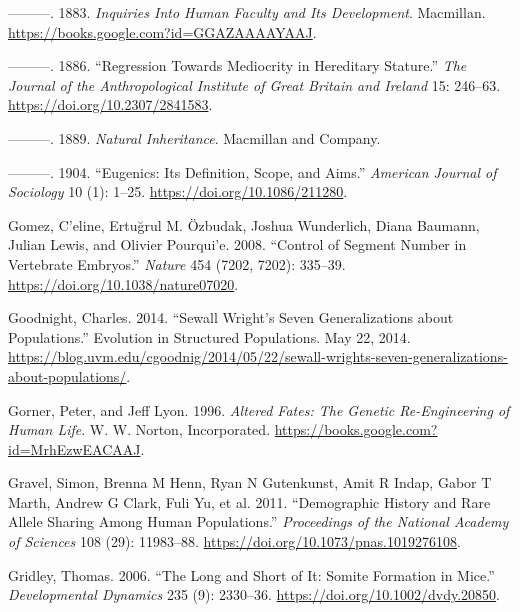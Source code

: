 \documentclass[
]{book}
\newlength{\cslhangindent}
\newlength{\cslentryspacingunit} %
\newenvironment{CSLReferences}[2] %
 {%
  \setlength{\parindent}{0pt}
  \ifodd #1
  \let\oldpar\par
  \def\par{\hangindent=\cslhangindent\oldpar}
  \fi
  \setlength{\parskip}{#2\cslentryspacingunit}
 }%
 {}
\begin{document}
\begin{CSLReferences}{1}{0}
\leavevmode{}%
---------. 1883. \emph{Inquiries {Into Human Faculty} and {Its Development}}. {Macmillan}. \url{https://books.google.com?id=GGAZAAAAYAAJ}.

\leavevmode{}%
---------. 1886. {``Regression {Towards Mediocrity} in {Hereditary Stature}.''} \emph{The Journal of the Anthropological Institute of Great Britain and Ireland} 15: 246--63. \url{https://doi.org/10.2307/2841583}.

\leavevmode{}%
---------. 1889. \emph{Natural Inheritance}. {Macmillan and Company}.

\leavevmode{}%
---------. 1904. {``Eugenics: {Its Definition}, {Scope}, and {Aims}.''} \emph{American Journal of Sociology} 10 (1): 1--25. \url{https://doi.org/10.1086/211280}.

\leavevmode{}%
Gomez, C'eline, Ertuğrul M. Özbudak, Joshua Wunderlich, Diana Baumann, Julian Lewis, and Olivier Pourqui'e. 2008. {``Control of Segment Number in Vertebrate Embryos.''} \emph{Nature} 454 (7202, 7202): 335--39. \url{https://doi.org/10.1038/nature07020}.

\leavevmode{}%
Goodnight, Charles. 2014. {``Sewall {Wright}'s {Seven Generalizations} about {Populations}.''} {Evolution in Structured Populations}. May 22, 2014. \url{https://blog.uvm.edu/cgoodnig/2014/05/22/sewall-wrights-seven-generalizations-about-populations/}.

\leavevmode{}%
Gorner, Peter, and Jeff Lyon. 1996. \emph{Altered {Fates}: {The Genetic Re-Engineering} of {Human Life}}. {W. W. Norton, Incorporated}. \url{https://books.google.com?id=MrhEzwEACAAJ}.

\leavevmode{}%
Gravel, Simon, Brenna M Henn, Ryan N Gutenkunst, Amit R Indap, Gabor T Marth, Andrew G Clark, Fuli Yu, et al. 2011. {``Demographic History and Rare Allele Sharing Among Human Populations.''} \emph{Proceedings of the National Academy of Sciences} 108 (29): 11983--88. \url{https://doi.org/10.1073/pnas.1019276108}.

\leavevmode{}%
Gridley, Thomas. 2006. {``The Long and Short of It: {Somite} Formation in Mice.''} \emph{Developmental Dynamics} 235 (9): 2330--36. \url{https://doi.org/10.1002/dvdy.20850}.


\end{CSLReferences}
\end{document}
